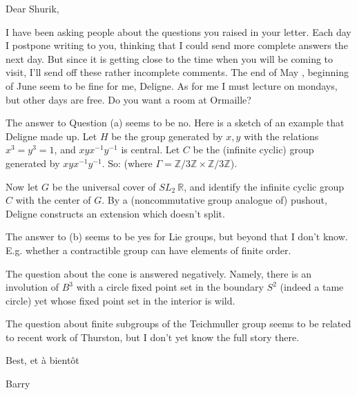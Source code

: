 Dear Shurik,

I have been asking people about the questions you raised in your letter. Each day I postpone writing to you, thinking that I could send more complete answers the next day. But since it is getting close to the time  when  you will be coming to visit, I'll send off these rather incomplete comments. The end of May , beginning of June seem to be fine for me, Deligne. As for me I must lecture on mondays, but  other days are free. Do you want a room at Ormaille?

The answer to Question (a) seems to be no. Here is a sketch of an example that Deligne made up. Let $H$ be the group generated by $x,y$ with the relations $x^3=y^3=1$, and $xyx^{-1}y^{-1}$ is central. Let $C$ be the (infinite cyclic) group generated by $xyx^{-1}y^{-1}$. So:
(where $\Gamma=\mathbb Z/3\mathbb Z\times\mathbb Z/3\mathbb Z$).

Now let $G$ be the universal cover of $SL_2\ \mathbb R$, and identify the infinite cyclic group $C$ with the center of $G$. By a (noncommutative group analogue of) pushout, Deligne constructs an extension
which doesn't split.

The answer to (b) seems to be yes for Lie groups, but beyond that I don't know. E.g. whether a contractible group  can have elements of finite order.

The question about the cone is answered negatively. Namely, there is an involution of $B^3$ with a circle fixed point set in the boundary $S^2$ (indeed a tame circle) yet whose fixed point set in the interior is wild. 

The question about finite subgroups of the Teichmuller group seems to be related to recent work of Thurston, but I don't yet know the full story there.


Best, et à bientôt

Barry

